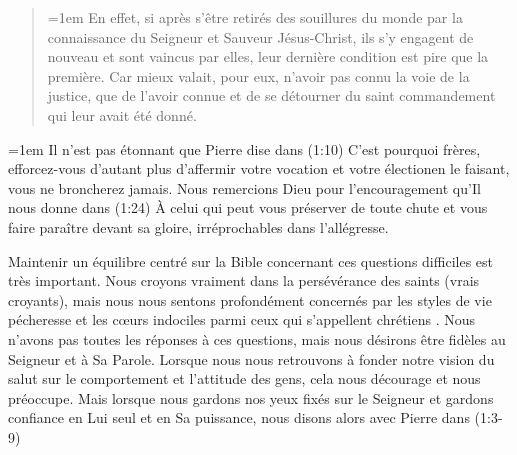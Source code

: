 \pocketpagebreak

\begin{quote}
\begin{pocketpar}{\emergencystretch=1em}
 \Og En effet, si après s'être retirés
 des souil\-lures du monde par la connaissance du Seigneur et Sauveur Jésus-Christ,
 ils s'y engagent de nouveau et sont vaincus par elles, leur dernière condition
 est pire que la première.
 Car mieux valait, pour eux, n'avoir pas connu la voie de la justice,
 que de l'avoir connue et de se détourner du saint commandement
 qui leur avait été donné. \Fg{}
\end{pocketpar}
\end{quote}

\begin{digestpar}{\BRallowhypbch}
\begin{pocketpar}{\emergencystretch=1em}
Il n'est pas étonnant que Pierre dise dans (1:10)\frcolon
 \Og C'est pourquoi frères, efforcez-vous d'autant plus d'affermir
 votre vocation et votre élection\frcolon en le faisant, vous ne broncherez jamais. \Fg{}
Nous remercions Dieu pour l'encouragement qu'Il nous donne dans (1:24)\frcolon
 \Og À celui qui peut vous préserver de toute chute et vous faire paraître
 devant sa gloire, irréprochables dans l'allégresse. \Fg{}
\end{pocketpar}
\end{digestpar}

\begin{pocketpar}{}
Maintenir un équilibre centré sur la Bible concernant ces questions difficiles est très important.
 Nous croyons vraiment dans la persévérance des saints (vrais croyants),
 mais nous nous sentons profondément concernés par les styles de vie pécheresse
 et les cœurs indociles parmi ceux qui s'appellent \Og chrétiens \Fg{}.
 Nous n'avons pas toutes les réponses à ces questions,
 mais nous désirons être fidèles au Seigneur et à Sa Parole.
 Lorsque nous nous retrouvons à fonder notre vision du salut
 sur le comportement et l'attitude des gens, cela nous
 décourage et nous préoccupe.
 Mais lorsque nous gardons nos yeux fixés sur le Seigneur et gardons confiance en Lui seul
 et en Sa puissance, nous disons alors avec Pierre dans
 (1:3-9)\frcolon
\end{pocketpar}

